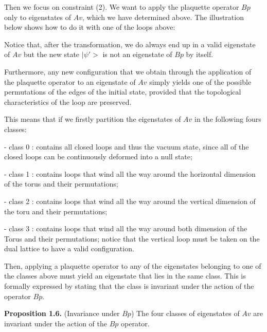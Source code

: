 \documentclass[12pt]{report}
\begin{document}
\begin{minipage}{1\textwidth}
	
	Then we focus on constraint (2). We want to apply the plaquette operator $Bp$ only to eigenstates of $Av$, which we have determined above. The illustration below shows how to do it with one of the loops above:\newline
	
	
	
	Notice that, after the transformation, we do always end up in a valid eigenstate of $Av$ but the new state $|\psi'>$ is not an eigenstate of $Bp$ by itself.\newline
	
	Furthermore, any new configuration that we obtain through the application of the plaquette operator to an eigenstate of $Av$ simply yields one of the possible permutations of the edges of the initial state, provided that the topological characteristics of the loop are preserved.\newline
	
	This means that if we firstly partition the eigenstates of $Av$ in the following fours classes: \newline
	
	- class 0 : contains all closed loops and thus the vacuum state,
	since all of the closed loops can be continuously deformed into a null state; \newline
	
	- class 1 : contains loops that wind all the way around the horizontal dimension of the torus and their permutations;\newline
	
	- class 2 : contains loops that wind all the way around the vertical dimension of the toru and their permutations;\newline
	
	- class 3 : contains loops that wind all the way around both dimension of the Torus and their permutations; notice that the vertical loop must be taken on the dual lattice to have a valid configuration.\newline
	
	Then, applying a plaquette operator to any of the eigenstates belonging to one of the classes above must yield an eigenstate that lies in the same class. This is formally expressed by stating that the class is invariant under the action of the operator $Bp$. \newline
	
	\textbf{Proposition 1.6.} (Invariance under $Bp$) The four classes of eigenstates of $Av$ are invariant under the action of the $Bp$ operator. \newline
	

\end{minipage}
\end{document}
